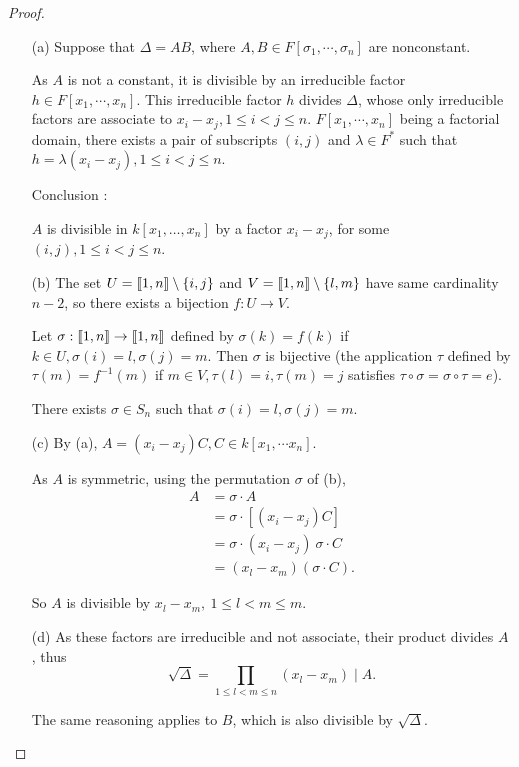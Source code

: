 \documentclass[11pt,a4paper]{article}
\def\gcro{\mbox{[\hspace{-.15em}[}}%
\def\dcro{\mbox{]\hspace{-.15em}]}}
\begin{document}
\begin{proof}
\begin{enumerate}
\item[(a)] 
Suppose that $\Delta = A B$, where $A,B \in F[\sigma_1,\cdots,\sigma_n]$ are nonconstant.

As $A$ is not a constant, it is divisible by an irreducible factor $h \in F[x_1,\cdots,x_n]$. This irreducible factor $h$ divides $\Delta$, whose only irreducible factors are associate to $x_i-x_j,1\leq i<j\leq n$. $F[x_1,\cdots,x_n]$ being a factorial domain, there exists a pair of subscripts $(i,j)$ and $\lambda \in F^*$ such that $h =\lambda ( x_i-x_j),1\leq i<j\leq n$.

Conclusion : 

$A$ is divisible in $k[x_1,\ldots,x_n]$ by a factor $x_i-x_j$, for some $(i,j), 1 \leq i <j\leq n$.


\item[(b)] 
The set $U = \gcro1,n\dcro \setminus \{i,j\}$ and $V = \gcro1,n\dcro \setminus \{l,m\}$ have same cardinality $n-2$, so there exists a bijection $f : U \to V$.

Let $\sigma :\gcro1,n\dcro \to \gcro1,n\dcro$ defined by $\sigma(k) = f(k)$ if $k\in U, \sigma(i) = l, \sigma(j) = m$. Then $\sigma$ is bijective (the application $\tau$  defined by $\tau(m) = f^{-1}(m)$ if $m \in V, \tau(l)=i,\tau(m) = j$ satisfies $\tau \circ \sigma = \sigma \circ \tau = e$).

There exists $\sigma \in S_n$ such that $\sigma(i) = l, \sigma(j)=m$.


\item[(c)] 
By (a),
$A = (x_i-x_j) C, C \in k[x_1,\cdots x_n]$. 

As $A$ is symmetric, using the permutation $\sigma$ of (b), 
\begin{align*}
A &=\sigma\cdot A\\
&=\sigma\cdot[(x_i-x_j) C]\\
&= \sigma \cdot(x_i-x_j)\ \sigma\cdot C\\
&=(x_l-x_m) (\sigma\cdot C).
\end{align*}

So $A$ is divisible by $x_l-x_m,\ 1\leq l<m\leq m$.


\item[(d)] 
As these factors are irreducible and not associate, their product divides $A$, thus 
$$\sqrt{\Delta} = \prod_{1\leq l <m\leq n} (x_l-x_m) \mid A.$$

The same reasoning applies to $B$, which is also divisible by $\sqrt{\Delta}$.



\end{enumerate}
\end{proof}
\end{document}
